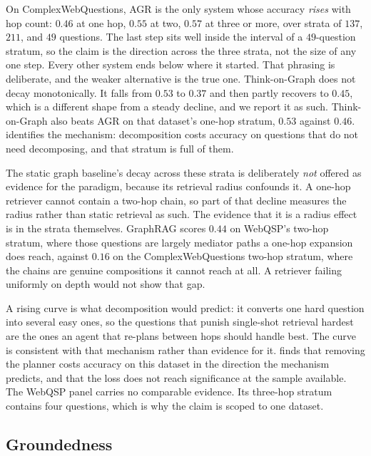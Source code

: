 On ComplexWebQuestions, AGR is the only system whose accuracy
\emph{rises} with hop count: $0.46$ at one hop, $0.55$ at two, $0.57$ at
three or more, over strata of $137$, $211$, and $49$ questions. The last
step sits well inside the interval of a $49$-question stratum, so the
claim is the direction across the three strata, not the size of any one
step. Every other system ends below where it started. That phrasing is
deliberate, and the weaker alternative is the true one. Think-on-Graph
does not decay monotonically. It falls from $0.53$ to $0.37$ and then
partly recovers to $0.45$, which is a different shape from a steady
decline, and we report it as such. Think-on-Graph also beats AGR on that
dataset's one-hop stratum, $0.53$ against $0.46$. 
identifies the mechanism: decomposition costs accuracy on questions that
do not need decomposing, and that stratum is full of them.

The static graph baseline's decay across these strata is deliberately
\emph{not} offered as evidence for the paradigm, because its retrieval
radius confounds it. A one-hop retriever cannot contain a two-hop chain,
so part of that decline measures the radius rather than static retrieval
as such. The evidence that it is a radius effect is in the strata
themselves. GraphRAG scores $0.44$ on WebQSP's two-hop stratum, where
those questions are largely mediator paths a one-hop expansion does
reach, against $0.16$ on the ComplexWebQuestions two-hop stratum, where
the chains are genuine compositions it cannot reach at all. A retriever
failing uniformly on depth would not show that gap.

A rising curve is what decomposition would predict: it converts one hard
question into several easy ones, so the questions that punish
single-shot retrieval hardest are the ones an agent that re-plans
between hops should handle best. The curve is consistent with that
mechanism rather than evidence for it.  finds that
removing the planner costs accuracy on this dataset in the direction the
mechanism predicts, and that the loss does not reach significance at the
sample available. The WebQSP panel carries no comparable evidence. Its
three-hop stratum contains four questions, which is why the claim is
scoped to one dataset.

\subsection{Groundedness}\label{sec:groundedness}

